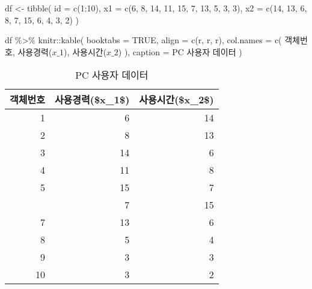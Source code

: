 \documentclass[
]{book}
\newenvironment{Shaded}{\begin{snugshade}}{\end{snugshade}}
\newcommand{\AttributeTok}[1]{\textcolor[rgb]{0.77,0.63,0.00}{#1}}
\newcommand{\ConstantTok}[1]{\textcolor[rgb]{0.00,0.00,0.00}{#1}}
\newcommand{\DecValTok}[1]{\textcolor[rgb]{0.00,0.00,0.81}{#1}}
\newcommand{\FunctionTok}[1]{\textcolor[rgb]{0.00,0.00,0.00}{#1}}
\newcommand{\NormalTok}[1]{#1}
\newcommand{\OtherTok}[1]{\textcolor[rgb]{0.56,0.35,0.01}{#1}}
\newcommand{\SpecialCharTok}[1]{\textcolor[rgb]{0.00,0.00,0.00}{#1}}
\newcommand{\StringTok}[1]{\textcolor[rgb]{0.31,0.60,0.02}{#1}}
\begin{document}
\begin{Shaded}
\begin{Highlighting}[]
\NormalTok{df }\OtherTok{\textless{}{-}} \FunctionTok{tibble}\NormalTok{(}
  \AttributeTok{id =} \FunctionTok{c}\NormalTok{(}\DecValTok{1}\SpecialCharTok{:}\DecValTok{10}\NormalTok{),}
  \AttributeTok{x1 =} \FunctionTok{c}\NormalTok{(}\DecValTok{6}\NormalTok{, }\DecValTok{8}\NormalTok{, }\DecValTok{14}\NormalTok{, }\DecValTok{11}\NormalTok{, }\DecValTok{15}\NormalTok{, }\DecValTok{7}\NormalTok{, }\DecValTok{13}\NormalTok{, }\DecValTok{5}\NormalTok{, }\DecValTok{3}\NormalTok{, }\DecValTok{3}\NormalTok{),}
  \AttributeTok{x2 =} \FunctionTok{c}\NormalTok{(}\DecValTok{14}\NormalTok{, }\DecValTok{13}\NormalTok{, }\DecValTok{6}\NormalTok{, }\DecValTok{8}\NormalTok{, }\DecValTok{7}\NormalTok{, }\DecValTok{15}\NormalTok{, }\DecValTok{6}\NormalTok{, }\DecValTok{4}\NormalTok{, }\DecValTok{3}\NormalTok{, }\DecValTok{2}\NormalTok{)}
\NormalTok{)}

\NormalTok{df }\SpecialCharTok{\%\textgreater{}\%}
\NormalTok{  knitr}\SpecialCharTok{::}\FunctionTok{kable}\NormalTok{(}
    \AttributeTok{booktabs =} \ConstantTok{TRUE}\NormalTok{,}
    \AttributeTok{align =} \FunctionTok{c}\NormalTok{(}\StringTok{\textquotesingle{}r\textquotesingle{}}\NormalTok{, }\StringTok{\textquotesingle{}r\textquotesingle{}}\NormalTok{, }\StringTok{\textquotesingle{}r\textquotesingle{}}\NormalTok{),}
    \AttributeTok{col.names =} \FunctionTok{c}\NormalTok{(}
      \StringTok{\textquotesingle{}객체번호\textquotesingle{}}\NormalTok{, }
      \StringTok{\textquotesingle{}사용경력($x\_1$)\textquotesingle{}}\NormalTok{, }
      \StringTok{\textquotesingle{}사용시간($x\_2$)\textquotesingle{}}
\NormalTok{      ),}
    \AttributeTok{caption =} \StringTok{\textquotesingle{}PC 사용자 데이터\textquotesingle{}}
\NormalTok{  )}
\end{Highlighting}
\end{Shaded}

\begin{table}

\caption{\label{tab:fuzzy-kmeans-data}PC 사용자 데이터}
\centering
\begin{tabular}[t]{rrr}
\toprule
객체번호 & 사용경력(\$x\_1\$) & 사용시간(\$x\_2\$)\\
\midrule
1 & 6 & 14\\
2 & 8 & 13\\
3 & 14 & 6\\
4 & 11 & 8\\
5 & 15 & 7\\
\addlinespace
6 & 7 & 15\\
7 & 13 & 6\\
8 & 5 & 4\\
9 & 3 & 3\\
10 & 3 & 2\\
\bottomrule
\end{tabular}
\end{table}
\end{document}

